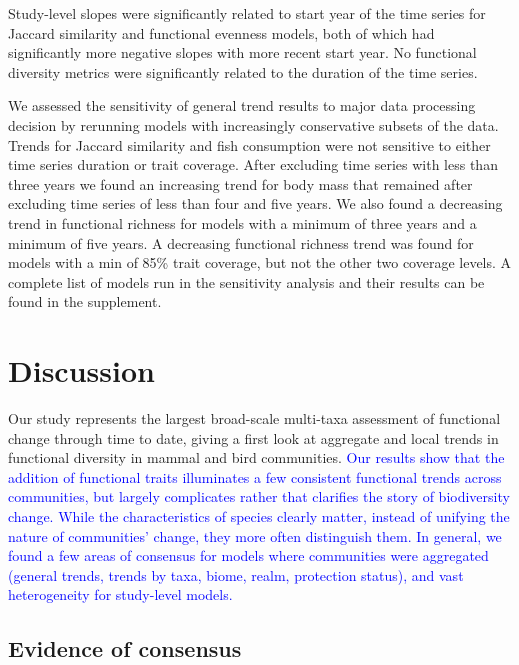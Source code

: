 \documentclass{article}
\begin{document}
Study-level slopes were significantly related to start year of the time
series for Jaccard similarity and functional evenness models, both of
which had significantly more negative slopes with more recent start
year. No functional diversity metrics were significantly related to the
duration of the time series.

We assessed the sensitivity of general trend results to major data
processing decision by rerunning models with increasingly conservative
subsets of the data. Trends for Jaccard similarity and fish consumption
were not sensitive to either time series duration or trait coverage.
After excluding time series with less than three years we found an
increasing trend for body mass that remained after excluding time series
of less than four and five years. We also found a decreasing trend in
functional richness for models with a minimum of three years and a
minimum of five years. A decreasing functional richness trend was found
for models with a min of 85\% trait coverage, but not the other two
coverage levels. A complete list of models run in the sensitivity
analysis and their results can be found in the supplement.

\hypertarget{discussion}{%
\section{Discussion}\label{discussion}}

Our study represents the largest broad-scale multi-taxa assessment of
functional change through time to date, giving a first look at aggregate
and local trends in functional diversity in mammal and bird communities.
\textcolor{blue}{Our results show that the addition of functional traits illuminates a few consistent functional trends across communities, but largely complicates rather that clarifies the story of biodiversity change. While the characteristics of species clearly matter, instead of unifying the nature of communities' change, they more often distinguish them. In general, we found a few areas of consensus for models where communities were aggregated (general trends, trends by taxa, biome, realm, protection status), and vast heterogeneity for study-level models.}

\hypertarget{evidence-of-consensus}{%
\subsection{Evidence of consensus}\label{evidence-of-consensus}}
\end{document}
